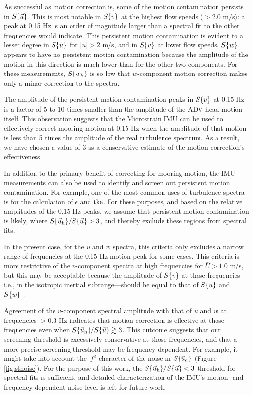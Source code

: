 As successful as motion correction is, some of the motion contamination persists in $S\{\vec{u}\}$. This is most notable in $S\{v\}$ at the highest flow speeds ($>2.0$ m/s): a peak at 0.15 Hz is an order of magnitude larger than a spectral fit to the other frequencies would indicate. This persistent motion contamination is evident to a lesser degree in $S\{u\}$ for $|u|>2$ m/s, and in $S\{v\}$ at lower flow speeds.  $S\{w\}$ appears to have no persistent motion contamination because the amplitude of the motion in this direction is much lower than for the other two components. For these measurements, $S\{w_h\}$ is so low that $w$-component motion correction makes only a minor correction to the spectra.

The amplitude of the persistent motion contamination peaks in $S\{v\}$ at 0.15 Hz is a factor of 5 to 10 times smaller than the amplitude of the ADV head motion itself. This observation suggests that the Microstrain IMU can be used to effectively correct mooring motion at 0.15 Hz when the amplitude of that motion is less than 5 times the amplitude of the real turbulence spectrum. As a result, we have chosen a value of 3 as a conservative estimate of the motion correction's effectiveness.

In addition to the primary benefit of correcting for mooring motion, the IMU measurements can also be used to identify and screen out persistent motion contamination. For example, one of the most common uses of turbulence spectra is for the calculation of $\epsilon$ and $\mathrm{tke}$. For these purposes, and based on the relative amplitudes of the 0.15-Hz peaks, we assume that persistent motion contamination is likely, where $S\{\vec{u}_\mathrm{h}\}/S\{\vec{u}\} > 3$, and thereby exclude these regions from spectral fits.

In the present case, for the $u$ and $w$ spectra, this criteria only excludes a narrow range of frequencies at the 0.15-Hz motion peak for some cases. This criteria is more restrictive of the $v$-component spectra at high frequencies for $\bar U > 1.0$ m/s, but this may be acceptable because the amplitude of $S\{v\}$ at these frequencies---i.e., in the isotropic inertial subrange---should be equal to that of $S\{u\}$ and $S\{w\}$ \cite[]{Kolmogorov1941c}.

Agreement of the $v$-component spectral amplitude with that of $u$ and $w$ at frequencies $>0.3$ Hz indicates that motion correction is effective at those frequencies even when $S\{\vec{u}_\mathrm{h}\}/S\{\vec{u}\} \gtrsim 3$. This outcome suggests that our screening threshold is excessively conservative at those frequencies, and that a more precise screening threshold may be frequency dependent. For example, it might take into account the $~f^3$ character of the noise in $S\{\vec{u}_a\}$ (Figure \ref{fig:stnoise}). For the purpose of this work, the $S\{\vec{u}_\mathrm{h}\}/S\{\vec{u}\} < 3$ threshold for spectral fits is sufficient, and detailed characterization of the IMU's motion- and frequency-dependent noise level is left for future work.


